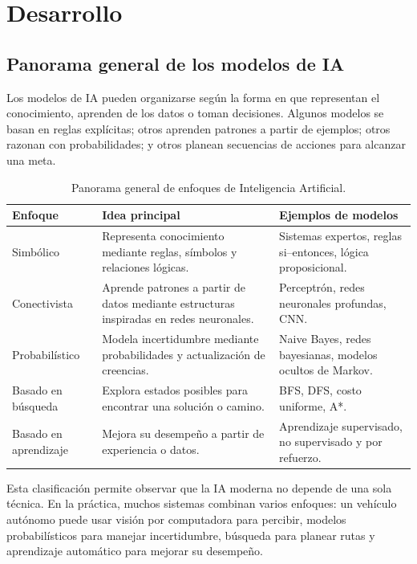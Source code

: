 \section{Desarrollo}

\subsection{Panorama general de los modelos de IA}

Los modelos de IA pueden organizarse según la forma en que representan el conocimiento, aprenden de los datos o toman decisiones. Algunos modelos se basan en reglas explícitas; otros aprenden patrones a partir de ejemplos; otros razonan con probabilidades; y otros planean secuencias de acciones para alcanzar una meta.

\begin{table}[h!]
\centering
\small
\renewcommand{\arraystretch}{1.25}
\begin{tabularx}{\textwidth}{L{3.4cm} Y Y}
\toprule
\textbf{Enfoque} & \textbf{Idea principal} & \textbf{Ejemplos de modelos} \\
\midrule
Simbólico & Representa conocimiento mediante reglas, símbolos y relaciones lógicas. & Sistemas expertos, reglas si--entonces, lógica proposicional. \\
Conectivista & Aprende patrones a partir de datos mediante estructuras inspiradas en redes neuronales. & Perceptrón, redes neuronales profundas, CNN. \\
Probabilístico & Modela incertidumbre mediante probabilidades y actualización de creencias. & Naive Bayes, redes bayesianas, modelos ocultos de Markov. \\
Basado en búsqueda & Explora estados posibles para encontrar una solución o camino. & BFS, DFS, costo uniforme, A*. \\
Basado en aprendizaje & Mejora su desempeño a partir de experiencia o datos. & Aprendizaje supervisado, no supervisado y por refuerzo. \\
\bottomrule
\end{tabularx}
\caption{Panorama general de enfoques de Inteligencia Artificial.}
\label{tab:enfoques}
\end{table}

Esta clasificación permite observar que la IA moderna no depende de una sola técnica. En la práctica, muchos sistemas combinan varios enfoques: un vehículo autónomo puede usar visión por computadora para percibir, modelos probabilísticos para manejar incertidumbre, búsqueda para planear rutas y aprendizaje automático para mejorar su desempeño.

